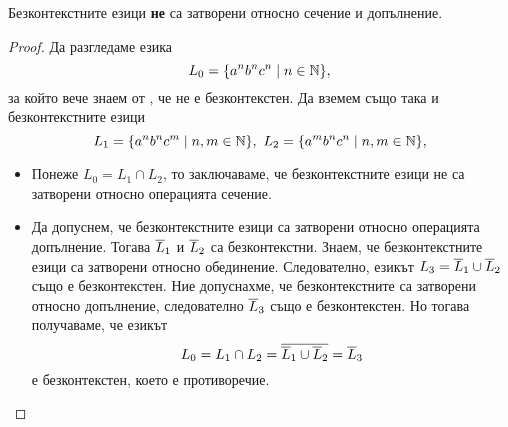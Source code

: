 \begin{framed}
  \begin{prop}
    Безконтекстните езици {\bf не} са затворени относно сечение и допълнение.
  \end{prop}
\end{framed}
\begin{proof}
  Да разгледаме езика
  \[L_0 = \{a^nb^nc^n\mid n\in\mathbb{N}\},\] за който вече знаем от , че не е безконтекстен.
  Да вземем също така и безконтекстните езици 
  \[L_1 = \{a^nb^nc^m\mid n,m\in\mathbb{N}\},\ L_2 = \{a^mb^nc^n\mid n,m\in\mathbb{N}\},\]
  \begin{itemize}
  \item 
    Понеже $L_0 = L_1\cap L_2$, то заключаваме, че безконтекстните езици не са затворени 
    относно операцията сечение.
  \item
    Да допуснем, че безконтекстните езици са затворени относно операцията допълнение.
    Тогава  $\overline{L}_1$ и $\overline{L}_2$ са безконтекстни.
    Знаем, че безконтекстните езици са затворени относно обединение. 
    Следователно, езикът $L_3 = \overline{L}_1 \cup \overline{L}_2$ също е безконтекстен.
    Ние допуснахме, че безконтекстните са затворени относно допълнение, следователно $\overline{L}_3$
    също е безконтекстен.
    Но тогава получаваме, че езикът
    \[L_0 = L_1 \cap L_2 = \overline{\overline{L}_1 \cup \overline{L}_2} = \overline{L}_3\]
    е безконтекстен, което е противоречие.
  \end{itemize}
\end{proof}


